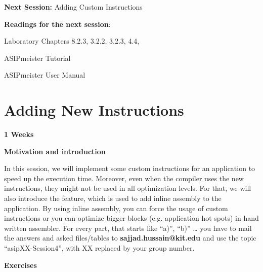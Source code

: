 \documentclass[
]{article}
\begin{document}
\textbf{Next Session:} Adding Custom Instructions

\textbf{Readings for the next session}:

Laboratory Chapters 8.2.3, 3.2.2, 3.2.3, 4.4,

ASIPmeister Tutorial

ASIPmeister User Manual

\hypertarget{adding-new-instructions}{%
\section{\texorpdfstring{\textbf{Adding} New
\textbf{Instructions}}{Adding New Instructions}}\label{adding-new-instructions}}

\textbf{{1 Weeks}}

\textbf{Motivation and introduction}

In this session, we will implement some custom instructions for an
application to speed up the execution time. Moreover, even when the
compiler uses the new instructions, they might not be used in all
optimization levels. For that, we will also introduce the feature, which
is used to add inline assembly to the application. By using inline
assembly, you can force the usage of custom instructions or you can
optimize bigger blocks (e.g. application hot spots) in hand written
assembler. For every part, that starts like ``a)'', ``b)'' \ldots{} you
have to mail the answers and asked files/tables to
\textbf{sajjad.hussain@kit.edu} and use the topic ``asipXX-Session4'',
with XX replaced by your group number.

\textbf{Exercises}
\end{document}

